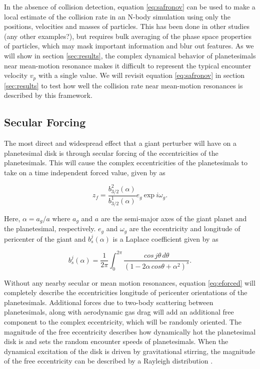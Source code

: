 \documentclass[onecolumn]{aastex63}
\begin{document}
In the absence of collision detection, equation \ref{eq:safronov} can be used to make a local estimate of the 
collision rate in an N-body simulation using only the positions, velocities and masses of particles. This has been done in other studies 
\citep{2017ApJ...850..103B} (any other examples?), but requires bulk averaging of the phase space properties of particles, which 
may mask important information and blur out features. As we will show in section \ref{sec:results}, the complex dynamical behavior of 
planetesimals near mean-motion resonance makes it difficult to represent the typical encounter velocity $v_{p}$ with a single value. We will 
revisit equation \ref{eq:safronov} in section \ref{sec:results} to test how well the collision rate near mean-motion resonances is described by 
this framework.

\subsection{Secular Forcing}\label{sec:sec_force}

The most direct and widespread effect that a giant perturber will have on a planetesimal disk is through secular forcing of the 
eccentricities of the planetesimals. This will cause the complex eccentricities of the planetesimals to take on a time independent 
forced value, given by \citep{1999ApJ...527..918W} as

\begin{equation}\label{eq:eforced}
	z_{f} = \frac{b^{2}_{3/2} (\alpha)}{b^{1}_{3/2} (\alpha)} e_{g} ~ \mathrm{exp} ~ i \omega_{g}.
\end{equation}

\noindent Here, $\alpha = a_{g} / a$ where $a_{g}$ and $a$ are the semi-major axes of the giant planet and the planetesimal, 
respectively. $e_{g}$ and $\omega_{g}$ are the eccentricity and longitude of pericenter of the giant and $b^{j}_{s} (\alpha)$ is a 
Laplace coefficient given by \citep{2000ssd..book.....M} as

\begin{equation}\label{eq:lap}
	b_{s}^{j}(\alpha) = \frac{1}{2 \pi} \int_{0}^{2 \pi} \frac{cos \, j \theta \, d \theta}{\left( 1 - 2 \alpha \, cos \theta + \alpha^2 \right)^{s}}.
\end{equation}

Without any nearby secular or mean motion resonances, equation \ref{eq:eforced} will completely describe the eccentricities longitude of  pericenter orientations of the planetesimals. Additional forces due to two-body scattering between planetesimals, along with 
aerodynamic gas drag will add an additional free component to the complex eccentricity, which will be randomly oriented. The 
magnitude of the free eccentricity describes how dynamically hot the planetesimal disk is and sets the random encounter speeds of 
planetesimals. When the dynamical excitation of the disk is driven by gravitational stirring, the magnitude of the free eccentricity can 
be described by a Rayleigh distribution \citep{1992Icar...96..107I}.
\end{document}
